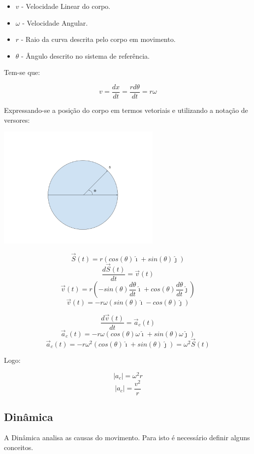 \documentclass[
    12pt, %
    openright,
    twoside, %
    a4paper, %
    article,
    english,brazil %
]{abntex2}
\begin{document}
\begin{itemize}
    \item $v$ - Velocidade Linear do corpo. 
    \item $\omega$ - Velocidade Angular. 
    \item $r$ - Raio da curva descrita pelo corpo em movimento. 
    \item $\theta$ - Ângulo descrito no sistema de referência.
\end{itemize}

Tem-se que:

$$ v = \frac{dx}{dt} = \frac{rd\theta}{dt} = r\omega$$

Expressando-se a posição do corpo em termos vetoriais e utilizando a notação de versores:

\includegraphics[width=\linewidth,height=6cm,keepaspectratio,]{./fig/Circulo.png}

$$\vec S(t) = r(cos(\theta)\hat \imath + sin(\theta)\hat \jmath)$$
$$\frac{d\vec S(t)}{dt} = \vec v(t)$$
$$\vec v(t) = r(-sin(\theta)\frac{d\theta}{dt}\hat \imath + cos(\theta)\frac{d\theta}{dt}\hat \jmath)$$
$$\vec v(t) = -r\omega(sin(\theta)\hat \imath - cos(\theta)\hat \jmath)$$

$$\frac{d\vec v(t)}{dt} = \vec a_c(t)$$
$$\vec a_c(t) = -r\omega(cos(\theta)\omega\hat \imath + sin(\theta)\omega\hat \jmath)$$
$$\vec a_c(t) = -r\omega^2(cos(\theta)\hat \imath + sin(\theta)\hat \jmath) = \omega^2\vec S(t)$$

Logo:

$$|a_c| = \omega^2r$$
$$|a_c| = \frac{v^2}{r}$$

\subsection{Dinâmica}

A Dinâmica analisa as causas do movimento. Para isto é necessário definir alguns conceitos.
\end{document}

